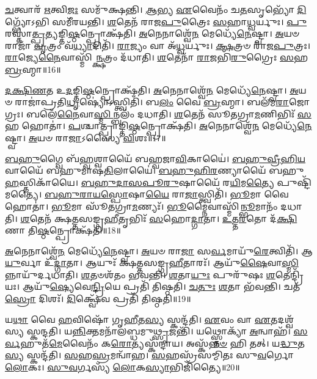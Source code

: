 \-\ul{𑌚}\-𑌤𑍍𑌵𑌾𑌰᳴ \ul{𑌋}\-𑌤𑍍𑌵𑌿\-\ul{𑌜𑌃} 𑌸𑌮𑍁᳴𑌕𑍍𑌷𑌨𑍍𑌤𑌿।
\-\ul{𑌆}\-𑌭𑍍𑌯 \ul{𑌏}\-𑌵𑍈𑌨𑌂᳴ 𑌚\-\ul{𑌤}\-𑌸𑍃𑌭𑍍𑌯𑍋᳴ \ul{𑌦𑌿}\-𑌗𑍍𑌭𑍍𑌯𑍋᳴𑌽𑌭𑌿 𑌸𑌮𑍀᳴𑌰𑌯𑌨𑍍𑌤𑌿।
\-\ul{𑌶}\-𑌤𑍇𑌨᳴ 𑌰𑌾𑌜\-\ul{𑌪𑍁}\-𑌤𑍍𑌰𑍈𑌃 \ul{𑌸}\-𑌹𑌾\-\ul{𑌧𑍍𑌵}\-𑌰𑍍𑌯𑍁𑌃।
\-\ul{𑌪𑍁}\-𑌰𑌸𑍍𑌤𑌾॑\-\ul{𑌤𑍍𑌪𑍍𑌰}\-𑌤𑍍𑌯𑌙𑍍𑌤𑌿\-\ul{𑌷𑍍𑌠}\-𑌨𑍍𑌪𑍍𑌰𑍋𑌕𑍍𑌷᳴𑌤𑌿।
\-\ul{𑌅}\-𑌨𑍇𑌨𑌾𑌶𑍍𑌵𑍇᳴\-\ul{𑌨} 𑌮𑍇𑌧𑍍𑌯𑍇᳴\-\ul{𑌨𑍇}\-𑌷𑍍𑌟𑍍𑌵𑌾।
\-\ul{𑌅}\-𑌯𑍞 𑌰𑌾𑌜𑌾᳴ \ul{𑌵𑍃}\-𑌤𑍍𑌰𑌂 𑌵᳴\-\ul{𑌧𑍍𑌯𑌾}\-𑌦𑌿𑌤𑌿᳴।
\-\ul{𑌰𑌾}\-𑌜𑍍𑌯𑌂 𑌵𑌾 𑌅᳴\-\ul{𑌧𑍍𑌵}\-𑌰𑍍𑌯𑍁𑌃।
\-\ul{𑌕𑍍𑌷}\-𑌤𑍍𑌰𑍞 𑌰𑌾᳴𑌜\-\ul{𑌪𑍁}\-𑌤𑍍𑌰𑌃।
\-\ul{𑌰𑌾}\-𑌜𑍍𑌯𑍇\-\-\ul{𑌨𑍈}\-𑌵𑌾𑌸𑍍𑌮𑌿᳴\-\ul{𑌨𑍍𑌕𑍍𑌷}\-𑌤𑍍𑌰𑌂 𑌦᳴𑌧𑌾𑌤𑌿।
\-\ul{𑌶}\-𑌤𑍇𑌨𑌾᳴ \ul{𑌰𑌾}\-𑌜𑌭𑌿᳴\-\ul{𑌰𑍁}\-𑌗𑍍𑌰𑍈𑌃 \ul{𑌸}\-𑌹 \ul{𑌬𑍍𑌰}\-𑌹𑍍𑌮𑌾॥16॥

\-\ul{𑌦}\-\-\ul{𑌕𑍍𑌷𑌿}\-\-\ul{𑌣}\-𑌤 𑌉\-\ul{𑌦}\-𑌙𑍍𑌤𑌿\-\ul{𑌷𑍍𑌠}\-𑌨𑍍𑌪𑍍𑌰𑍋𑌕𑍍𑌷᳴𑌤𑌿।
\-\ul{𑌅}\-𑌨𑍇𑌨𑌾𑌶𑍍𑌵𑍇᳴\-\ul{𑌨} 𑌮𑍇𑌧𑍍𑌯𑍇᳴\-\ul{𑌨𑍇}\-𑌷𑍍𑌟𑍍𑌵𑌾।
\-\ul{𑌅}\-𑌯𑍞 𑌰𑌾𑌜𑌾॑𑌪𑍍𑌰𑌤𑌿\-\ul{𑌧𑍃}\-𑌷𑍍𑌯𑍋॑\-𑌽𑌸𑍍𑌤𑍍𑌵𑌿𑌤𑌿᳴।
𑌬\-\ul{𑌲𑌂} 𑌵𑍈 \ul{𑌬𑍍𑌰}\-𑌹𑍍𑌮𑌾।
𑌬𑌲᳴𑌮\-\ul{𑌰𑌾}\-𑌜𑍋𑌗𑍍𑌰𑌃।
𑌬𑌲𑍇᳴\-\ul{𑌨𑍈}\-𑌵𑌾\-\ul{𑌸𑍍𑌮𑌿}\-𑌨𑍍𑌬𑌲𑌂᳴ 𑌦𑌧𑌾𑌤𑌿।
\-\ul{𑌶}\-𑌤𑍇𑌨᳴ 𑌸𑍂𑌤𑌗𑍍𑌰𑌾\-\ul{𑌮}\-𑌣𑌿𑌭𑌿𑌃᳴ \ul{𑌸}\-𑌹 𑌹𑍋𑌤𑌾॑।
\-\ul{𑌪}\-𑌶𑍍𑌚𑌾𑌤𑍍𑌪𑍍𑌰𑌾𑌙𑍍𑌤𑌿\-\ul{𑌷𑍍𑌠}\-𑌨𑍍𑌪𑍍𑌰𑍋𑌕𑍍𑌷᳴𑌤𑌿।
\-\ul{𑌅}\-𑌨𑍇𑌨𑌾𑌶𑍍𑌵𑍇᳴\-\ul{𑌨} 𑌮𑍇𑌧𑍍𑌯𑍇᳴\-\ul{𑌨𑍇}\-𑌷𑍍𑌟𑍍𑌵𑌾।
\-\ul{𑌅}\-𑌯𑍞 𑌰𑌾\-\ul{𑌜𑌾}\-\-𑌽𑌸𑍍𑌯𑍈 \ul{𑌵𑌿}\-𑌶𑌃॥17॥

\-\ul{𑌬}\-\-\ul{𑌹𑍁}\-𑌗𑍍𑌵𑍈 𑌬᳴\-\ul{𑌹𑍍𑌵}\-𑌶𑍍𑌵𑌾𑌯𑍈᳴ 𑌬𑌹𑍍𑌵𑌜𑌾\-\ul{𑌵𑌿}\-𑌕𑌾𑌯𑍈॑।
\-\ul{𑌬}\-\-\ul{𑌹𑍁}\-\-\ul{𑌵𑍍𑌰𑍀}\-\-\ul{𑌹𑌿}\-\-\ul{𑌯}\-𑌵𑌾𑌯𑍈᳴ 𑌬𑌹𑍁𑌮𑌾𑌷\-\-\ul{𑌤𑌿}\-𑌲𑌾𑌯𑍈॑।
\-\ul{𑌬}\-\-\ul{𑌹𑍁}\-\-\ul{𑌹𑌿}\-\-\ul{𑌰}\-𑌣𑍍𑌯𑌾𑌯𑍈᳴ 𑌬𑌹𑍁\-\ul{𑌹}\-𑌸𑍍𑌤𑌿𑌕𑌾᳴𑌯𑍈।
\-\ul{𑌬}\-\-\ul{𑌹𑍁}\-\-\ul{𑌦𑌾}\-\-\ul{𑌸}\-\-\-\ul{𑌪𑍂}\-\-\ul{𑌰𑍁}\-𑌷𑌾𑌯𑍈᳴ 𑌰\-\ul{𑌯𑌿}\-𑌮\-\ul{𑌤𑍍𑌯𑍈} 𑌪𑍁𑌷𑍍𑌟𑌿᳴𑌮𑌤𑍍𑌯𑍈।
\-\ul{𑌬}\-\-\ul{𑌹𑍁}\-\-\ul{𑌰𑌾}\-\-\ul{𑌯}\-\-\ul{𑌸𑍍𑌪𑍋}\-𑌷𑌾\-\ul{𑌯𑍈} 𑌰𑌾\-\ul{𑌜𑌾}\-𑌸𑍍𑌤𑍍𑌵𑌿𑌤𑌿᳴।
\-\ul{𑌭𑍂}\-𑌮𑌾 𑌵𑍈 𑌹𑍋𑌤𑌾॑।
\-\ul{𑌭𑍂}\-𑌮𑌾 𑌸𑍂᳴𑌤𑌗𑍍𑌰𑌾\-\ul{𑌮}\-𑌣𑍍𑌯𑌃᳴।
\-\ul{𑌭𑍂}\-𑌮𑍍𑌨𑍈𑌵𑌾𑌸𑍍𑌮𑌿᳴\-\ul{𑌨𑍍𑌭𑍂}\-𑌮𑌾𑌨𑌂᳴ 𑌦𑌧𑌾𑌤𑌿।
\-\ul{𑌶}\-𑌤𑍇𑌨᳴ 𑌕𑍍𑌷𑌤𑍍𑌤𑌸𑌙𑍍𑌗𑍍𑌰\-\ul{𑌹𑍀}\-𑌤𑍃𑌭𑌿𑌃᳴ \ul{𑌸}\-𑌹𑍋\-\ul{𑌦𑍍𑌗𑌾}\-𑌤𑌾।
\-\ul{𑌉}\-\-\ul{𑌤𑍍𑌤}\-\-\ul{𑌰}\-𑌤𑍋 𑌦᳴\-\ul{𑌕𑍍𑌷𑌿}\-𑌣𑌾 𑌤𑌿\-\ul{𑌷𑍍𑌠}\-𑌨𑍍𑌪𑍍𑌰𑍋𑌕𑍍𑌷᳴𑌤𑌿॥18॥

\-\ul{𑌅}\-𑌨𑍇𑌨𑌾𑌶𑍍𑌵𑍇᳴\-\ul{𑌨} 𑌮𑍇𑌧𑍍𑌯𑍇᳴\-\ul{𑌨𑍇}\-𑌷𑍍𑌟𑍍𑌵𑌾।
\-\ul{𑌅}\-𑌯𑍞 𑌰𑌾\-\ul{𑌜𑌾} 𑌸\-\ul{𑌰𑍍𑌵}\-𑌮𑌾𑌯𑍁᳴\-\ul{𑌰𑍇}\-𑌤𑍍𑌵𑌿𑌤𑌿᳴।
𑌆\-\ul{𑌯𑍁}\-𑌰𑍍𑌵𑌾 𑌉᳴\-\ul{𑌦𑍍𑌗𑌾}\-𑌤𑌾।
𑌆𑌯𑍁𑌃᳴ 𑌕𑍍𑌷𑌤𑍍𑌤𑌸𑌙𑍍𑌗𑍍𑌰\-\ul{𑌹𑍀}\-𑌤𑌾𑌰𑌃᳴।
𑌆𑌯𑍁᳴\-\ul{𑌷𑍈}\-𑌵𑌾\-\ul{𑌸𑍍𑌮𑌿}\-𑌨𑍍𑌨𑌾𑌯𑍁᳴𑌰𑍍𑌦\-𑌧𑌾𑌤𑌿।
\-\ul{𑌶}\-𑌤𑍞𑌶᳴𑌤𑌂 𑌭𑌵𑌨𑍍𑌤𑌿।
\-\ul{𑌶}\-𑌤𑌾\-\ul{𑌯𑍁𑌃} 𑌪𑍁𑌰𑍁᳴𑌷𑌃 \ul{𑌶}\-𑌤𑍇𑌨𑍍𑌦𑍍𑌰𑌿᳴𑌯𑌃।
𑌆𑌯𑍁᳴\-\ul{𑌷𑍍𑌯𑍇}\-𑌵𑍇\-\ul{𑌨𑍍𑌦𑍍𑌰𑌿}\-𑌯𑍇 𑌪𑍍𑌰𑌤𑌿᳴ 𑌤𑌿𑌷𑍍𑌠𑌤𑌿।
\-\ul{𑌚}\-\-\ul{𑌤𑍁𑌃} \ul{𑌶}\-𑌤𑌾 𑌭᳴𑌵𑌨𑍍𑌤𑌿।
𑌚𑌤᳴\-\ul{𑌸𑍍𑌰𑍋} 𑌦𑌿𑌶𑌃᳴।
\-\ul{𑌦𑌿}\-𑌕𑍍𑌷𑍍𑌵𑍇᳴𑌵 𑌪𑍍𑌰𑌤𑌿᳴ 𑌤𑌿𑌷𑍍𑌠𑌤𑌿॥19॥\anuvakamend[\-\ul{𑌬𑍍𑌰}\-𑌹𑍍𑌮𑌾 \ul{𑌵𑌿}\-𑌶 𑌉᳴𑌕𑍍𑌷\-\ul{𑌤𑌿} 𑌦𑌿\-\ul{𑌶} 𑌏𑌕𑌂᳴ 𑌚]

𑌯\-\ul{𑌥𑌾} 𑌵𑍈 \ul{𑌹}\-𑌵𑌿𑌷𑍋᳴ 𑌗𑍃\-\ul{𑌹𑍀}\-𑌤\-\ul{𑌸𑍍𑌯} 𑌸𑍍𑌕𑌨𑍍𑌦᳴𑌤𑌿।
\-\ul{𑌏}\-𑌵𑌂 𑌵𑌾 \ul{𑌏}\-𑌤𑌦𑌶𑍍𑌵᳴𑌸𑍍𑌯 𑌸𑍍𑌕𑌨𑍍𑌦𑌤𑌿।
𑌯\-\ul{𑌨𑍍𑌨𑌿}\-𑌕𑍍𑌤𑌮𑌨𑌾᳴𑌲𑌬𑍍𑌧𑌮𑍁\-\ul{𑌥𑍍𑌸𑍃}\-𑌜𑌨𑍍𑌤𑌿᳴।
𑌯𑌥𑍍𑌸𑍍𑌤𑍋𑌕𑍍𑌯𑌾᳴ \ul{𑌅}\-𑌨𑍍𑌵𑌾𑌹᳴।
\-\ul{𑌸}\-\-\ul{𑌰𑍍𑌵}\-𑌹𑍁𑌤᳴\-\ul{𑌮𑍇}\-𑌵𑍈𑌨𑌂᳴ 𑌕\-\ul{𑌰𑍋}\-𑌤𑍍𑌯𑌸𑍍𑌕᳴𑌨𑍍𑌦𑌾𑌯।
𑌅𑌸𑍍𑌕᳴\-\ul{𑌨𑍍𑌨}\-\-\ul{𑍞} 𑌹𑌿 𑌤𑌤𑍍।
𑌯\-\ul{𑌦𑍍𑌧𑍁}\-𑌤\-\ul{𑌸𑍍𑌯} 𑌸𑍍𑌕𑌨𑍍𑌦᳴𑌤𑌿।
\-\ul{𑌸}\-𑌹\-\ul{𑌸𑍍𑌰}\-𑌮𑌨𑍍𑌵𑌾᳴𑌹।
\-\ul{𑌸}\-𑌹𑌸𑍍𑌰᳴𑌸𑌮𑍍𑌮𑌿𑌤𑌃 𑌸𑍁\-\ul{𑌵}\-𑌰𑍍𑌗𑍋 \ul{𑌲𑍋}\-𑌕𑌃।
\-\ul{𑌸𑍁}\-\-\ul{𑌵}\-𑌰𑍍𑌗𑌸𑍍𑌯᳴ \ul{𑌲𑍋}\-𑌕\-\ul{𑌸𑍍𑌯𑌾}\-𑌭𑌿𑌜𑌿᳴𑌤𑍍𑌯𑍈॥20॥

